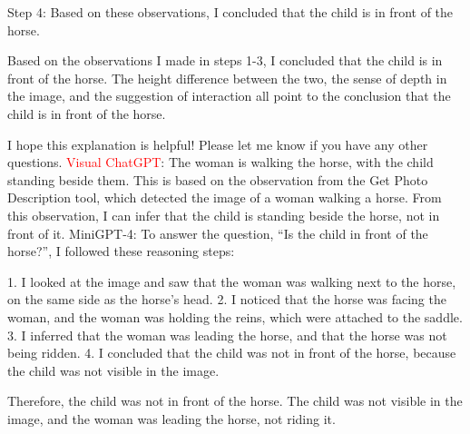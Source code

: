 \begin{enumerate}
        Step 4: Based on these observations, I concluded that the child is in front of the horse.
        
        Based on the observations I made in steps 1-3, I concluded that the child is in front of the horse. The height difference between the two, the sense of depth in the image, and the suggestion of interaction all point to the conclusion that the child is in front of the horse.
        
        I hope this explanation is helpful! Please let me know if you have any other questions.
        \subitem \textcolor{red}{Visual ChatGPT}: The woman is walking the horse, with the child standing beside them. This is based on the observation from the Get Photo Description tool, which detected the image of a woman walking a horse. From this observation, I can infer that the child is standing beside the horse, not in front of it.
        \subitem MiniGPT-4: To answer the question, “Is the child in front of the horse?”, I followed these reasoning steps:

        1. I looked at the image and saw that the woman was walking next to the horse, on the same side as the horse’s head.
        2. I noticed that the horse was facing the woman, and the woman was holding the reins, which were attached to the saddle.
        3. I inferred that the woman was leading the horse, and that the horse was not being ridden.
        4. I concluded that the child was not in front of the horse, because the child was not visible in the image.
        
        Therefore, the child was not in front of the horse. The child was not visible in the image, and the woman was leading the horse, not riding it.
    \end{enumerate}
